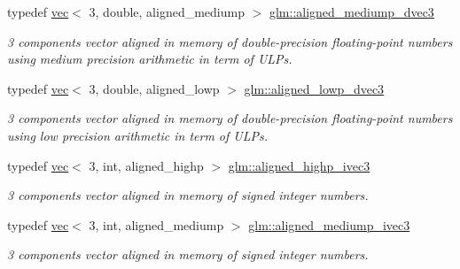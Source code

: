 \begin{DoxyCompactItemize}
\mbox{\label{group__gtc__type__aligned_gacd6fc80d8b9b4322560c9c27927da5e5}} 
typedef \hyperlink{structglm_1_1vec}{vec}$<$ 3, double, aligned\+\_\+mediump $>$ \hyperlink{group__gtc__type__aligned_gacd6fc80d8b9b4322560c9c27927da5e5}{glm\+::aligned\+\_\+mediump\+\_\+dvec3}
\begin{DoxyCompactList}\small\item\em 3 components vector aligned in memory of double-\/precision floating-\/point numbers using medium precision arithmetic in term of U\+L\+Ps. \end{DoxyCompactList}\item 
\mbox{\label{group__gtc__type__aligned_gab8af6a04a9e5c763725913b11df3cec0}} 
typedef \hyperlink{structglm_1_1vec}{vec}$<$ 3, double, aligned\+\_\+lowp $>$ \hyperlink{group__gtc__type__aligned_gab8af6a04a9e5c763725913b11df3cec0}{glm\+::aligned\+\_\+lowp\+\_\+dvec3}
\begin{DoxyCompactList}\small\item\em 3 components vector aligned in memory of double-\/precision floating-\/point numbers using low precision arithmetic in term of U\+L\+Ps. \end{DoxyCompactList}\item 
\mbox{\label{group__gtc__type__aligned_gaa469d8bf0cb9ae640c943d847ec48f95}} 
typedef \hyperlink{structglm_1_1vec}{vec}$<$ 3, int, aligned\+\_\+highp $>$ \hyperlink{group__gtc__type__aligned_gaa469d8bf0cb9ae640c943d847ec48f95}{glm\+::aligned\+\_\+highp\+\_\+ivec3}
\begin{DoxyCompactList}\small\item\em 3 components vector aligned in memory of signed integer numbers. \end{DoxyCompactList}\item 
\mbox{\label{group__gtc__type__aligned_gad835ac79ecdcae8d6292b37656f54973}} 
typedef \hyperlink{structglm_1_1vec}{vec}$<$ 3, int, aligned\+\_\+mediump $>$ \hyperlink{group__gtc__type__aligned_gad835ac79ecdcae8d6292b37656f54973}{glm\+::aligned\+\_\+mediump\+\_\+ivec3}
\begin{DoxyCompactList}\small\item\em 3 components vector aligned in memory of signed integer numbers. \end{DoxyCompactList}\item 

\end{DoxyCompactItemize}
